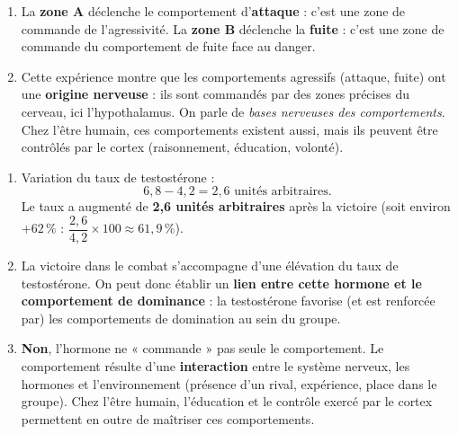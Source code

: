 \documentclass[11pt]{article}
\begin{document}
\begin{corrige}
\begin{enumerate}
\item La \textbf{zone A} déclenche le comportement d'\textbf{attaque} : c'est une zone de commande de l'agressivité. La \textbf{zone B} déclenche la \textbf{fuite} : c'est une zone de commande du comportement de fuite face au danger.
\item Cette expérience montre que les comportements agressifs (attaque, fuite) ont une \textbf{origine nerveuse} : ils sont commandés par des zones précises du cerveau, ici l'hypothalamus. On parle de \emph{bases nerveuses des comportements}. Chez l'être humain, ces comportements existent aussi, mais ils peuvent être contrôlés par le cortex (raisonnement, éducation, volonté).
\end{enumerate}
\end{corrige}

\begin{corrige}
\begin{enumerate}
\item Variation du taux de testostérone :
\[ 6,8 - 4,2 = 2,6 \text{ unités arbitraires.} \]
Le taux a augmenté de \textbf{2,6 unités arbitraires} après la victoire (soit environ $+62\,\%$ : $\dfrac{2,6}{4,2}\times 100 \approx 61,9\,\%$).
\item La victoire dans le combat s'accompagne d'une élévation du taux de testostérone. On peut donc établir un \textbf{lien entre cette hormone et le comportement de dominance} : la testostérone favorise (et est renforcée par) les comportements de domination au sein du groupe.
\item \textbf{Non}, l'hormone ne « commande » pas seule le comportement. Le comportement résulte d'une \textbf{interaction} entre le système nerveux, les hormones et l'environnement (présence d'un rival, expérience, place dans le groupe). Chez l'être humain, l'éducation et le contrôle exercé par le cortex permettent en outre de maîtriser ces comportements.
\end{enumerate}
\end{corrige}
\end{document}
